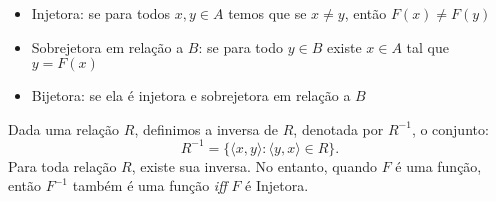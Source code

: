          \begin{itemize}
            \item Injetora: se para todos $x, y \in A$ temos que se $x \neq y$, então $F(x) \neq F(y)$
            \item Sobrejetora em relação a $B$: se para todo $y \in B$ existe $x \in A$ tal que $y = F(x)$
            \item Bijetora: se ela é injetora e sobrejetora em relação a $B$
         \end{itemize}
         \begin{definition}[Inversa]
            Dada uma relação $R$, definimos a inversa de $R$, denotada por $R^{-1}$, o conjunto:
            $$R^{-1} = \{\langle x, y \rangle: \langle y, x \rangle \in R\}.$$
            Para toda relação $R$, existe sua inversa. No entanto, quando $F$ é uma função, então $F^{-1}$ também é uma função \textit{iff} $F$ é Injetora.
         \end{definition}

